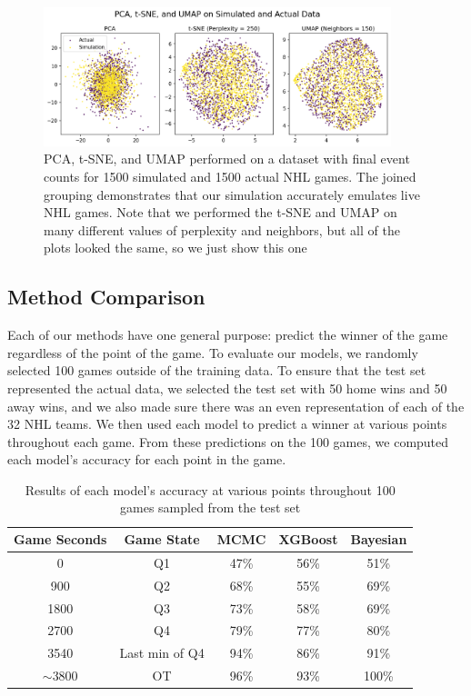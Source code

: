 \documentclass[11pt]{article}
\begin{document}
\begin{figure}
    \centering
    \includegraphics[width=0.9\textwidth]{images/pca_tsne_umap_sim_act.png}
    \caption{PCA, t-SNE, and UMAP performed on a dataset with final event counts for 1500 simulated and 1500 actual NHL games. The joined grouping demonstrates that our simulation accurately emulates live NHL games. Note that we performed the t-SNE and UMAP on many different values of perplexity and neighbors, but all of the plots looked the same, so we just show this one}
    \label{fig:simulation_v_actual}
\end{figure}

\subsection{Method Comparison}
Each of our methods have one general purpose: predict the winner of the game regardless of the point of the game. 
To evaluate our models, we randomly selected 100 games outside of the training data. 
To ensure that the test set represented the actual data, we selected the test set with 50 home wins and 50 away wins, 
and we also made sure there was an even representation of each of the 32 NHL teams. 
We then used each model to predict a winner at various points throughout each game. 
From these predictions on the 100 games, we computed each model's accuracy for each point in the game.

\begin{table}
    \centering
    \begin{tabular}{ |c|c|c|c|c| } 
    \hline
    \textbf{Game Seconds} & \textbf{Game State} & \textbf{MCMC} & \textbf{XGBoost} & \textbf{Bayesian} \\ 
    \hline
    0 & Q1 & 47\% & 56\% & 51\% \\ 
    \hline
    900 & Q2 & 68\% & 55\% & 69\% \\
    \hline
    1800 & Q3 & 73\% & 58\% & 69\% \\
    \hline
    2700 & Q4 & 79\% & 77\% & 80\% \\
    \hline
    3540 & Last min of Q4 & 94\% & 86\% & 91\% \\
    \hline
     \(\sim \)3800 & OT & 96\% & 93\% & 100\% \\
    \hline
    \end{tabular}
    \caption{Results of each model's accuracy at various points throughout 100 games sampled from the test set}
    \label{tab:game_accuracies}
\end{table}
\end{document}
